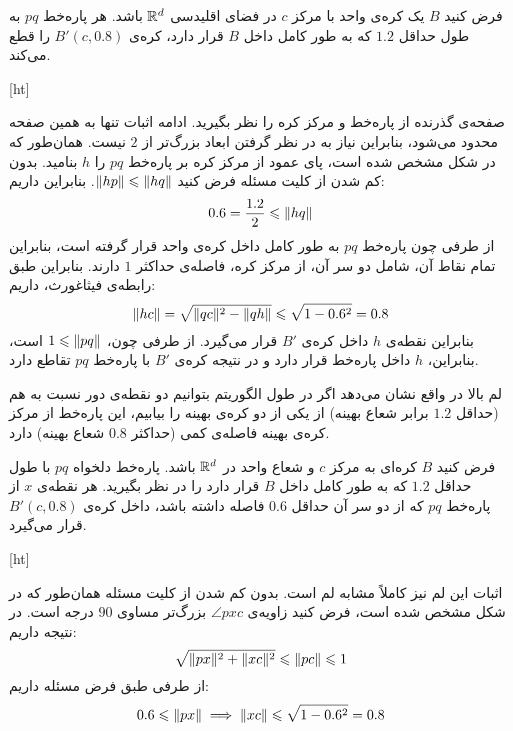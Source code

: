 فرض کنید $B$ یک کره‌ی واحد با مرکز $c$ در فضای اقلیدسی $\mathbb{R}^d$ باشد.
هر پاره‌خط $pq$ به طول حداقل $1.2$ که به طور کامل داخل $B$ قرار دارد، کره‌ی $B'(c, 0.8)$ را قطع می‌کند.

[ht]


صفحه‌ی گذرنده از پاره‌خط و مرکز کره را نظر بگیرید.
ادامه اثبات تنها به همین صفحه محدود می‌شود، بنابراین نیاز به در نظر گرفتن ابعاد بزرگ‌تر از $2$ نیست.
همان‌طور که در شکل  مشخص شده است، پای عمود از مرکز کره بر پاره‌خط $pq$ را $h$ بنامید.
بدون کم شدن از کلیت مسئله فرض کنید $\|{hp}\| \leqslant \|{hq}\|$. بنابراین داریم:
$$0.6 = \frac{1.2}{2} \leqslant \|{hq}\|$$
از‌ طرفی چون پاره‌خط $pq$ به طور کامل داخل کره‌ی واحد قرار گرفته است، بنابراین تمام نقاط آن، شامل دو سر آن، از مرکز کره، فاصله‌ی حداکثر $1$ دارند.
بنابراین طبق رابطه‌ی فیثاغورث، داریم:
$$\|{hc}\| = \sqrt{\|{qc}\|^2 - \|{qh}\|} \leqslant \sqrt{1 - 0.6^2} = 0.8$$
بنابراین نقطه‌ی $h$ داخل کره‌ی $B'$ قرار می‌گیرد.
از طرفی چون، $1 \leqslant \|{pq}\|$ است، بنابراین، $h$ داخل پاره‌خط قرار دارد و در نتیجه کره‌ی $B'$ با پاره‌خط $pq$ تقاطع دارد. 


لم بالا در واقع نشان می‌دهد اگر در طول الگوریتم بتوانیم دو نقطه‌ی دور نسبت به هم (حداقل $1.2$ برابر شعاع بهینه) از یکی از دو کره‌ی بهینه را بیابیم، این پاره‌خط از مرکز کره‌ی بهینه فاصله‌ی کمی (حداکثر $0.8$ شعاع بهینه) دارد.

فرض کنید $B$ کره‌ای به مرکز $c$ و شعاع واحد در $\mathbb{R}^d$ باشد.
پاره‌خط دلخواه $pq$ با طول حداقل $1.2$ که به طور کامل داخل $B$ قرار دارد را در نظر بگیرید.
هر نقطه‌ی $x$ از پاره‌خط $pq$ که از دو سر آن حداقل $0.6$ فاصله داشته باشد، داخل کره‌ی $B'(c, 0.8)$ قرار می‌گیرد.


[ht]


اثبات این لم نیز کاملاً مشابه لم  است.
بدون کم شدن از کلیت مسئله همان‌طور که در شکل  مشخص شده است، فرض کنید زاویه‌ی $\angle{pxc}$ بزرگ‌تر مساوی $90$ درجه است.
در نتیجه داریم:
$$\sqrt{\|{px}\|^2 + \|{xc}\|^2} \leqslant \|{pc}\| \leqslant 1$$
از طرفی طبق فرض مسئله داریم:
$$0.6 \leqslant \|{px}\| \implies \|{xc}\| \leqslant \sqrt{1 - 0.6^2} = 0.8$$

